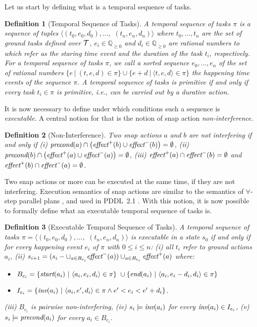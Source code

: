 \documentclass[letterpaper]{article} %
\newtheorem{definition}{Definition}
\newcommand{\pre}{\text{\it precond}}
\newcommand{\add}{\text{\it effect}^{+}}
\newcommand{\del}{\text{\it effect}^{-}}
\newcommand{\tstart}{\text{\it start}}
\newcommand{\tend}{\text{\it end}}
\newcommand{\tinv}{\text{\it inv}}
\begin{document}
Let us start by defining what is a temporal sequence of tasks.
\begin{definition}[Temporal Sequence of Tasks]
A {\it temporal sequence of tasks} $\pi$ is a sequence of tuples $\langle (t_0, e_0, d_0), \ldots,$ $(t_n, e_n, d_n) \rangle$ where $t_0, \ldots, t_n$ are the set of ground tasks defined over $\cal{T}$, $e_i \in \mathbb{Q}_{\geq 0}$ and $d_i \in \mathbb{Q}_{\geq 0}$ are rational numbers to which refer as the staring time event and the duration of the task $t_i$, respectively. For a temporal sequence of tasks $\pi$, we call a sorted sequence $e_0, \ldots, e_n$ of the set of rational numbers $\{e \ | \ (t, e, d) \in \pi\} \cup \{e + d \ | \ \langle t, e, d \rangle \in \pi\}$ the happening time events of the sequence $\pi$. %
A temporal sequence of tasks is primitive if and only if every task $t_i \in \pi$ is primitive, i.e., can be carried out by a durative action.
\end{definition}

It is now necessary to define under which conditions such a sequence is {\it executable}. A central notion for that is the notion of snap action {\it non-interference}.
\begin{definition}[Non-Interference]
Two snap actions $a$ and $b$ are not interfering if and only if (i) $\pre(a) \cap \bigl(\add(b) \cup \del(b)\bigr) = \emptyset$, (ii) $\pre(b) \cap \bigl(\add(a) \cup \del(a)\bigr) = \emptyset$, (iii) $\add(a) \cap \del(b) = \emptyset$ and  $\add(b) \cap \del(a) = \emptyset$.
\end{definition}
Two snap actions or more can be executed at the same time, if they are not interfering. Execution semantics of snap actions are similar to the semantics of $\forall$-step parallel plans \cite{rintanen06}, and used in PDDL~2.1 \cite{fox03}. With this notion, it is now possible to formally define what an executable temporal sequence of tasks is.

\begin{definition}[Executable Temporal Sequence of Tasks]
A temporal sequence of tasks $\pi = \langle (t_0, e_0, d_0), \ldots,$ $(t_n, e_n, d_n) \rangle$ is executable in a state $s_0$ if and only if for every happening event $e_i$ of $\pi$ with $0 \leq i \leq n$:
(i) all $t_i$ refer to ground actions $a_i$,
(ii) $s_{i+1} = (s_i - \cup_{a \in B_{e_i}} \del(a)) \cup_{a \in B_{e_i}} \add(a)$
 where:
\begin{itemize}
 \item $B_{e_i} = \{ \tstart(a_i) \ | \ \langle a_i, e_i, d_i \rangle \in \pi\} \ \cup  \{\tend(a_i) \ | \ \langle a_i, e_i - d_i, d_i \rangle \in \pi\}$
 \item $I_{e_i} = \{ \tinv(a_i) \ | \ \langle a_i,e',d_i\rangle \in \pi \wedge e' < e_i < e' + d_i\}$.
 \end{itemize}
(iii) $B_{e_i}$ is {\em pairwise non-interfering},
(iv) $s_i \models \tinv(a_i)$ for every $\tinv(a_i) \in I_{e_i}$, (v) $s_i \models \pre(a_i)$ for every $a_i \in B_{e_i}$.
 \end{definition}
\end{document}
